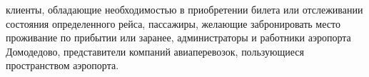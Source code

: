клиенты, обладающие необходимостью в приобретении билета или отслеживании состояния определенного рейса, 
пассажиры, желающие забронировать место проживание по прибытии или заранее,
администраторы и работники аэропорта Домодедово, представители компаний авиаперевозок, 
пользующиеся пространством аэропорта.